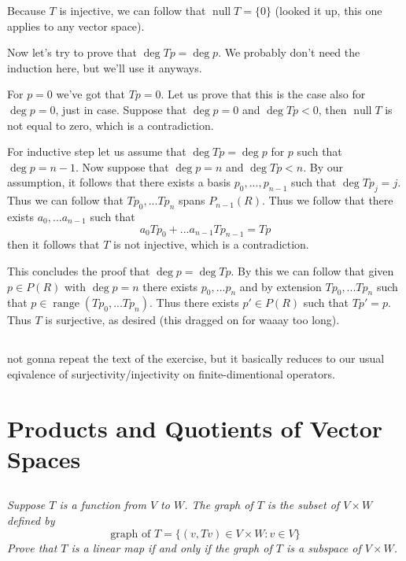 \documentclass[11pt,oneside,titlepage]{book}
\DeclareMathOperator \ns {null}
\DeclareMathOperator \range {range}
\begin{document}
Because $T$ is injective, we can follow that $\ns T = \{0\}$ (looked it up, this one applies
to any vector space).

Now let's try to prove that $\deg Tp = \deg p$.
We probably don't need the induction here, but we'll use it anyways.

For $p = 0$ we've got that $Tp = 0$. Let us prove that this is the case also
for $\deg p = 0$, just in case. Suppose that $\deg p = 0$ and $\deg Tp < 0$, then $\ns T$ is
not equal to zero, which is a contradiction.

For inductive step let us assume that $\deg Tp = \deg p$ for $p$ such that  $\deg p = n - 1$.
Now suppose that $\deg p = n$ and $\deg Tp < n$. By our assumption,  it follows that there exists
a basis $p_0, ..., p_{n - 1}$ such that $\deg T p_j = j$. Thus we can follow that $T p_0, ... T p_n$
spans $P_{n - 1}(R)$. Thus we follow that there exists $a_0, ... a_{n - 1}$ such that
$$a_0 T p_0 + ... a_{n - 1} T p_{n - 1} = T p$$
then it follows that $T$ is not injective, which is a contradiction.

This concludes the proof that $\deg p = \deg Tp$. By this we can follow that
given $p \in P(R)$ with $\deg p = n$ there exists $p_0, ... p_n$ and by extension
$T p_0, ... Tp_n$ such that $p \in \range(T p_0, ... Tp_n)$. Thus there exists
$p' \in P(R)$ such that $Tp' = p$. Thus $T$ is surjective, as desired (this dragged
on for waaay too long).

\subsection{}

not gonna repeat the text of the exercise, but it basically reduces to our usual eqivalence
of surjectivity/injectivity on finite-dimentional operators.

\section{Products and Quotients of Vector Spaces}

\subsection{}

\textit{Suppose $T$ is a function from $V$ to $W$. The graph of $T$ is the subset of
  $V \times W$ defined by }
$$\text{graph of } T = \{(v, Tv) \in V \times W: v \in V\}$$
\textit{Prove that $T$ is a linear map if and only if the graph of $T$  is a subspace
  of $V \times W$.}
\end{document}

